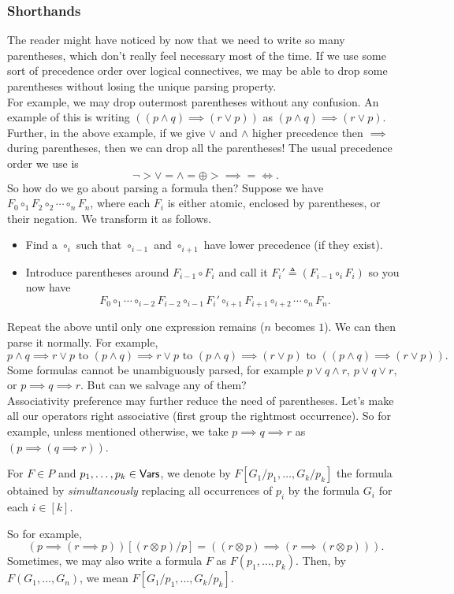 \subsubsection{Shorthands}

The reader might have noticed by now that we need to write so many parentheses, which don't really feel necessary most of the time. If we use some sort of precedence order over logical connectives, we may be able to drop some parentheses without losing the unique parsing property.\\
For example, we may drop outermost parentheses without any confusion. An example of this is writing $((p \wedge q)\implies (r \vee p))$ as $(p \wedge q)\implies (r \vee p)$.\\
Further, in the above example, if we give $\vee$ and $\wedge$ higher precedence then $\implies$ during parentheses, then we can drop all the parentheses! The usual precedence order we use is
\[ \neg > \vee = \wedge = \oplus > \implies = \iff. \]
So how do we go about parsing a formula then? Suppose we have $F_0\circ_1 F_2\circ_2 \cdots\circ_n F_n$, where each $F_i$ is either atomic, enclosed by parentheses, or their negation. We transform it as follows.
\begin{itemize}
    \item Find a $\circ_i$ such that $\circ_{i-1}$ and $\circ_{i+1}$ have lower precedence (if they exist).
    \item Introduce parentheses around $F_{i-1}\circ F_i$ and call it $F_i'\triangleq (F_{i-1}\circ_i F_i)$ so you now have
    \[ F_0 \circ_1 \cdots \circ_{i-2} F_{i-2} \circ_{i-1} F_i' \circ_{i+1} F_{i+1} \circ_{i+2} \cdots \circ_n F_n. \]
\end{itemize}
Repeat the above until only one expression remains ($n$ becomes $1$). We can then parse it normally. For example,
\[ p \wedge q \implies r \vee p \text{ to } (p\wedge q)\implies r\vee p \text{ to } (p\wedge q)\implies (r\vee p) \text{ to } ((p\wedge q)\implies (r\vee p)). \]
Some formulas cannot be unambiguously parsed, for example $p\vee q\wedge r$, $p \vee q \vee r$, or $p\implies q\implies r$. But can we salvage any of them?\\
Associativity preference may further reduce the need of parentheses. Let's make all our operators right associative (first group the rightmost occurrence). So for example, unless mentioned otherwise, we take $p\implies q\implies r$ as $(p\implies (q\implies r))$.

\begin{definition}
For $F\in P$ and $p_1,\ldots,p_k\in\mathsf{Vars}$, we denote by $F[G_1/p_1,\ldots,G_k/p_k]$ the formula obtained by \textit{simultaneously} replacing all occurrences of $p_i$ by the formula $G_i$ for each $i\in[k]$. 
\end{definition}

So for example,
\[ (p\implies (r\implies p))[(r\otimes p)/p] = ((r\otimes p)\implies (r\implies (r\otimes p))). \]
Sometimes, we may also write a formula $F$ as $F(p_1,\ldots,p_k)$. Then, by $F(G_1,\ldots,G_n)$, we mean $F[G_1/p_1,\ldots,G_k/p_k]$.